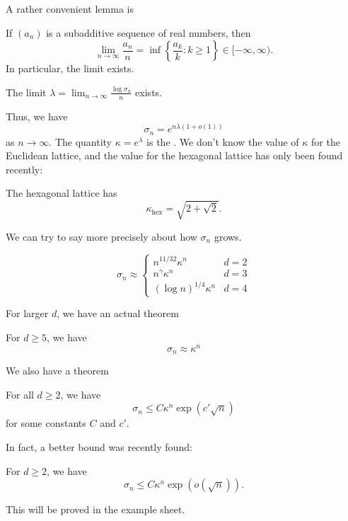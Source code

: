\documentclass[a4paper]{article}
\begin{document}
A rather convenient lemma is
\begin{lemma}
  If $(a_n)$ is a subadditive sequence of real numbers, then
  \[
    \lim_{n \to \infty} \frac{a_n}{n} = \inf\left\{\frac{a_k}{k}: k \geq 1\right\} \in [-\infty, \infty).
  \]
  In particular, the limit exists.
\end{lemma}

\begin{cor}
  The limit $\lambda = \lim_{n \to \infty} \frac{\log \sigma_n}{n}$ exists.
\end{cor}
Thus, we have
\[
  \sigma_n= e^{n \lambda (1 + o(1))}
\]
as $n \to \infty$. The quantity \index{$\kappa$}$\kappa = e^\lambda$ is the . We don't know the value of $\kappa$ for the Euclidean lattice, and the value for the hexagonal lattice has only been found recently:
\begin{thm} %
  The hexagonal lattice has
  \[
    \kappa_{\mathrm{hex}} = \sqrt{2 + \sqrt{2}}.
  \]
\end{thm}
We can try to say more precisely about how $\sigma_n$ grows.
\begin{conjecture}
  \[
    \sigma_n \approx
    \begin{cases}
      n^{11/32} \kappa^n & d = 2\\
      n^\gamma \kappa^n & d = 3\\
      (\log n)^{1/4} \kappa^n & d = 4
    \end{cases}
  \]
\end{conjecture}

For larger $d$, we have an actual theorem
\begin{thm} %
  For $d \geq 5$, we have
  \[
    \sigma_n \approx \kappa^n
  \]
\end{thm}

We also have a theorem
\begin{thm}
  For all $d \geq 2$, we have
  \[
    \sigma_n \leq C \kappa^n \exp(c' \sqrt{n})
  \]
  for some constants $C$ and $c'$.
\end{thm}

In fact, a better bound was recently found:
\begin{thm}[Hutchcroft]
  For $d \geq 2$, we have
  \[
     \sigma_n \leq C \kappa^n \exp(o(\sqrt{n})).
  \]
\end{thm}
This will be proved in the example sheet. %
\end{document}
